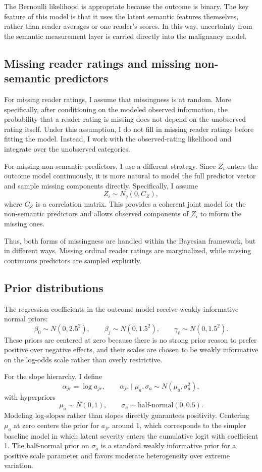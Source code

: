 \documentclass[twoside,11pt]{article}
\begin{document}
The Bernoulli likelihood is appropriate because the outcome is binary. The key feature of this model is that it uses the latent semantic features themselves, rather than reader averages or one reader's scores. In this way, uncertainty from the semantic measurement layer is carried directly into the malignancy model.

\subsection{Missing reader ratings and missing non-semantic predictors}

For missing reader ratings, I assume that missingness is at random. More specifically, after conditioning on the modeled observed information, the probability that a reader rating is missing does not depend on the unobserved rating itself. Under this assumption, I do not fill in missing reader ratings before fitting the model. Instead, I work with the observed-rating likelihood and integrate over the unobserved categories.

For missing non-semantic predictors, I use a different strategy. Since $Z_i$ enters the outcome model continuously, it is more natural to model the full predictor vector and sample missing components directly. Specifically, I assume
\[
Z_i \sim N_q(0,C_Z),
\]
where $C_Z$ is a correlation matrix. This provides a coherent joint model for the non-semantic predictors and allows observed components of $Z_i$ to inform the missing ones.

Thus, both forms of missingness are handled within the Bayesian framework, but in different ways. Missing ordinal reader ratings are marginalized, while missing continuous predictors are sampled explicitly.

\subsection{Prior distributions}

The regression coefficients in the outcome model receive weakly informative normal priors:
\[
\beta_0 \sim N(0,2.5^2), \qquad
\beta_j \sim N(0,1.5^2), \qquad
\gamma_\ell \sim N(0,1.5^2).
\]
These priors are centered at zero because there is no strong prior reason to prefer positive over negative effects, and their scales are chosen to be weakly informative on the log-odds scale rather than overly restrictive.

For the slope hierarchy, I define
\[
\alpha_{jr} = \log a_{jr},
\qquad
\alpha_{jr} \mid \mu_a,\sigma_a \sim N(\mu_a,\sigma_a^2),
\]
with hyperpriors
\[
\mu_a \sim N(0,1), \qquad
\sigma_a \sim \text{half-normal}(0,0.5).
\]
Modeling log-slopes rather than slopes directly guarantees positivity. Centering $\mu_a$ at zero centers the prior for $a_{jr}$ around 1, which corresponds to the simpler baseline model in which latent severity enters the cumulative logit with coefficient 1. The half-normal prior on $\sigma_a$ is a standard weakly informative prior for a positive scale parameter and favors moderate heterogeneity over extreme variation.
\end{document}

